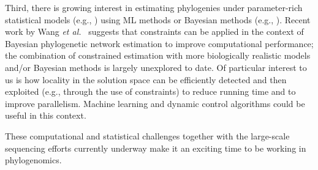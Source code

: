 Third, there is growing interest in estimating phylogenies under  parameter-rich statistical models (e.g., \cite{crotty2019ghost}) using \gls{ML} methods \cite{nguyen2015iqtree} or Bayesian methods (e.g., \cite{ronquist2003mrbayes, heled2010bayesian, hohna2016revbayes, ogilvie2017starbeast2, zhu2017bayesian}).
Recent work by Wang {\em et al.}~\cite{wang2020practical} suggests that constraints can be applied in the context of Bayesian phylogenetic network estimation to improve computational performance; the combination of constrained estimation with more biologically realistic models and/or Bayesian methods is largely unexplored to date.
Of particular interest to us is how locality in the solution space can be efficiently detected and then exploited (e.g., through the use of constraints) to reduce running time and to improve parallelism. Machine learning and dynamic control algorithms could be useful in this context.

These computational and statistical challenges together with the large-scale sequencing efforts currently underway make it an exciting time to be working in \glspl{phylogenomic}.

